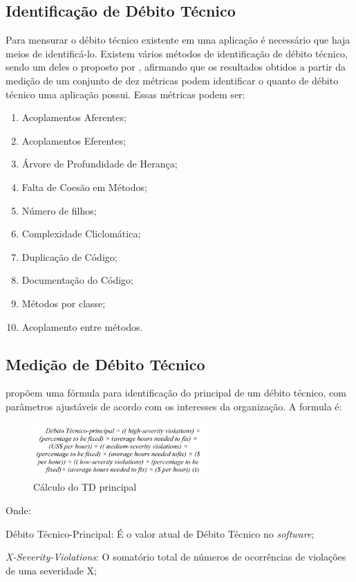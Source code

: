 \subsection{Identificação de Débito Técnico}
Para mensurar o débito técnico existente em uma aplicação é necessário que haja
meios de identificá-lo. Existem vários métodos de identificação de débito técnico,
sendo um deles o proposto por \cite{siebra}, afirmando que os resultados obtidos a
partir da medição de um conjunto de dez métricas podem identificar o quanto de
débito técnico uma aplicação possui. Essas métricas podem ser:

\begin{enumerate}
  \item Acoplamentos Aferentes;
  \item Acoplamentos Eferentes;
  \item Árvore de Profundidade de Herança;
  \item Falta de Coesão em Métodos;
  \item Número de filhos;
  \item Complexidade Cliclomática;
  \item Duplicação de Código;
  \item Documentação do Código;
  \item Métodos por classe;
  \item Acoplamento entre métodos.
\end{enumerate}

\subsection{Medição de Débito Técnico}
\cite{principal} propõem uma fórmula para identificação do principal de um
débito técnico, com parâmetros ajustáveis de acordo com os interesses da
organização. A formula é:

\begin{figure}[h]
  \centering
  \includegraphics[width=250px, scale=1]{figuras/formulaprincipal}
  \caption{Cálculo do TD principal}
\end{figure}
Onde:

Débito Técnico-Principal: É o valor atual de Débito Técnico no \textit{software};

\textit{X-Severity-Violations}: O somatório total de números de ocorrências de violações
de uma severidade X;

